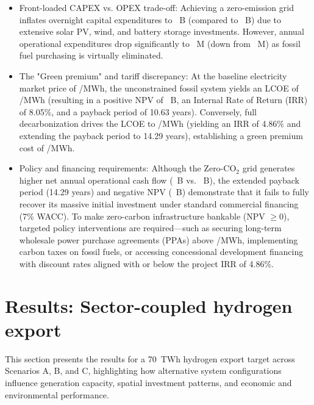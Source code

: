 \documentclass[preprint,12pt]{elsarticle}
\begin{document}
\begin{itemize}
    \item {Front-loaded CAPEX vs. OPEX trade-off:} Achieving a zero-emission grid inflates overnight capital expenditures to ~B (compared to ~B) due to extensive solar PV, wind, and battery storage investments. However, annual operational expenditures drop significantly to ~M (down from ~M) as fossil fuel purchasing is virtually eliminated.
    \item {The "Green premium" and tariff discrepancy:} At the baseline electricity market price of /MWh, the unconstrained fossil system yields an LCOE of /MWh (resulting in a positive NPV of ~B, an Internal Rate of Return (IRR) of 8.05\%, and a payback period of 10.63 years). Conversely, full decarbonization drives the LCOE to /MWh (yielding an IRR of 4.86\% and extending the payback period to 14.29 years), establishing a green premium cost of /MWh.
    \item {Policy and financing requirements:} Although the Zero-$\text{CO}_2$ grid generates higher net annual operational cash flow (~B vs. ~B), the extended payback period (14.29 years) and negative NPV (~B) demonstrate that it fails to fully recover its massive initial investment under standard commercial financing (7\% WACC). To make zero-carbon infrastructure bankable (NPV $\ge 0$), targeted policy interventions are required—such as securing long-term wholesale power purchase agreements (PPAs) above /MWh, implementing carbon taxes on fossil fuels, or accessing concessional development financing with discount rates aligned with or below the project IRR of 4.86\%.
\end{itemize}


\section{Results: Sector-coupled hydrogen export} 
\label{sec:results_sector_coupled_h2_3secns} 
This section presents the results for a 70~TWh hydrogen export target across Scenarios A, B, and C, highlighting how alternative system configurations influence generation capacity, spatial investment patterns, and economic and environmental performance.
\end{document}
